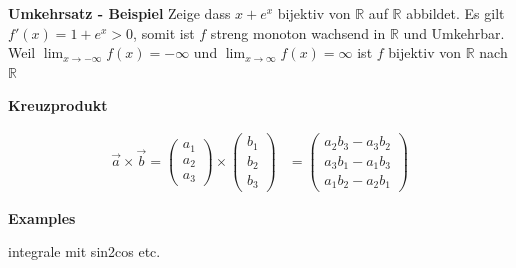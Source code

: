 \documentclass[25pt]{sciposter}
\newcommand{\R}{\mathbb{R}}
\newenvironment{method}[1]{\begin{mdframed}[backgroundcolor=blue!10,innertopmargin=15pt, innerbottommargin=15pt, nobreak=true]
		\textbf{#1 }
	}
	{ 
	\end{mdframed}
}
\begin{document}
\begin{multicols}{3}
\textbf{Umkehrsatz - Beispiel} Zeige dass $x + e^x$ bijektiv von $\R$ auf $\R$ abbildet. Es gilt $f'(x) = 1 + e^x > 0$, somit ist $f$ streng monoton wachsend in $\R$ und Umkehrbar. Weil $\lim_{x \to -\infty} f(x) = - \infty$ und $\lim_{x \to \infty} f(x) = \infty$ ist $f$ bijektiv von $\R$ nach $\R$



\begin{method}{Kreuzprodukt}
	\begin{align*}
	\vec{a}\times\vec{b}=	\begin{pmatrix}a_1 \\ a_2 \\ a_3\end{pmatrix}
	\times
	\begin{pmatrix}b_1 \\ b_2 \\ b_3 \end{pmatrix} &=	\begin{pmatrix}
	a_2b_3 - a_3b_2 \\
	a_3b_1 - a_1b_3 \\
	a_1b_2 - a_2b_1
	\end{pmatrix}
	\end{align*}
\end{method}

\textbf{Examples}


integrale mit sin2cos etc.
\newpage

\end{multicols}
\end{document}
